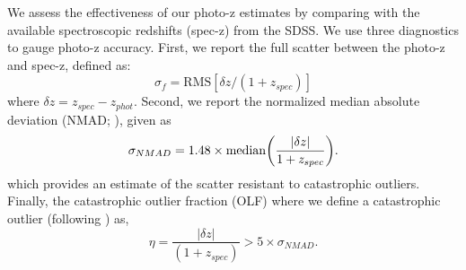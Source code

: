 \documentclass[apj, revtex4-1]{emulateapj}
\begin{document}
We assess the effectiveness of our photo-z estimates by comparing with the available spectroscopic redshifts (spec-z) from the SDSS. We use three diagnostics to gauge photo-z accuracy. First, we report the full scatter between the photo-z and spec-z, defined as:
\begin{equation}
	\sigma_f = \mathrm{RMS}[\delta z/(1+z_{spec})]
\end{equation}
where $\delta z = z_{spec} - z_{phot}$. Second, we report the normalized median absolute deviation (NMAD; \citealt{Ilbert2009, Dahlen2013, Molino2017}), given as
\begin{equation}
	\sigma_{NMAD} = 1.48 \times \mathrm{median} \bigg{(} \frac{|\delta z|}{1+z_{spec}} \bigg{)}.
\end{equation}
which provides an estimate of the scatter resistant to catastrophic outliers. Finally, the catastrophic outlier fraction (OLF) where we define a catastrophic outlier (following \citealt{Molino2017}) as,
\begin{equation}
	\eta = \frac{|\delta z|}{(1+z_{spec})} > 5 \times \sigma_{NMAD}.
\end{equation}
\end{document}
